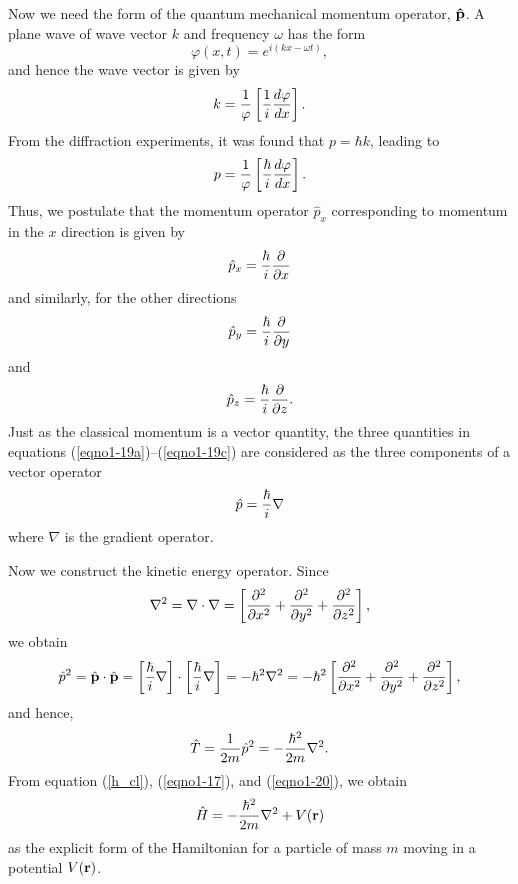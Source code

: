 Now we need the form of the quantum mechanical momentum operator,
${\bf{\hat p}}$. A plane wave of wave vector $k$ and frequency 
$\omega$ has the form
\begin{equation}
\varphi(x ,t) = e^{i(kx - \omega t)},
\end{equation}
and hence the wave vector is given by
\begin{equation}
k = {1 \over \varphi} \left[ {1 \over i} {d \varphi \over dx} 
\right].
\end{equation}
From the diffraction experiments, it was found that $p = \hbar k$, leading to
\begin{equation}
p = {1 \over \varphi} \left[ {\hbar \over i} {d \varphi \over dx} \right].
\end{equation}
Thus, we postulate that the momentum operator ${\hat p}_x$ corresponding to 
momentum in the $x$ direction is given by
\begin{equation}
{\hat p}_x = {\hbar \over i} {\partial \over \partial x}
\label{eqno1-19a}
\end{equation}
and similarly, for the other directions
\begin{equation}
{\hat p}_y = {\hbar \over i} {\partial \over \partial y}
\label{eqno1-19b}
\end{equation}
and
\begin{equation}
{\hat p}_z = {\hbar \over i} {\partial \over \partial z}.
\label{eqno1-19c}
\end{equation}
Just as the classical momentum is a vector quantity, the three
quantities in equations (\ref{eqno1-19a})--(\ref{eqno1-19c}) are
considered as the three components of a vector operator
\begin{equation}
{\hat p} = {\hbar \over i} \nabla
\end{equation}
where $\nabla$ is the gradient operator.

Now we construct the kinetic energy operator. Since
\begin{equation}
\nabla^2 = \nabla \cdot \nabla = \left[ {\partial^2 \over \partial x^2} + 
{\partial^2 \over \partial y^2} + {\partial^2 \over \partial z^2} \right],
\end{equation}
we obtain
\begin{equation}
{\hat p}^2 = {\hat{\bf p}} \cdot {\hat{\bf p}} = \left[ {\hbar \over i} 
\nabla \right] \cdot \left[ {\hbar \over i} \nabla \right] = - \hbar^2 
\nabla^2 = - \hbar^2 \left[ {\partial^2 \over \partial x^2} + {\partial^2 
\over \partial y^2} + {\partial^2 \over \partial z^2} \right] ,
\end{equation}
and hence,
\begin{equation}
{\hat T} = {1 \over 2m} {\hat p}^2 = - {\hbar^2 \over 2m} \nabla^2.
\label{eqno1-20}
\end{equation}
From equation (\ref{h_cl}), (\ref{eqno1-17}), and
(\ref{eqno1-20}), we obtain
\begin{equation}
{\hat H} = - {\hbar^2 \over 2m} \nabla^2 + V ( {\bf r} )
\label{eqno1-21}
\end{equation}
as the explicit form of the Hamiltonian for a particle of mass $m$ 
moving in a potential $V ( {\bf r} )$.

